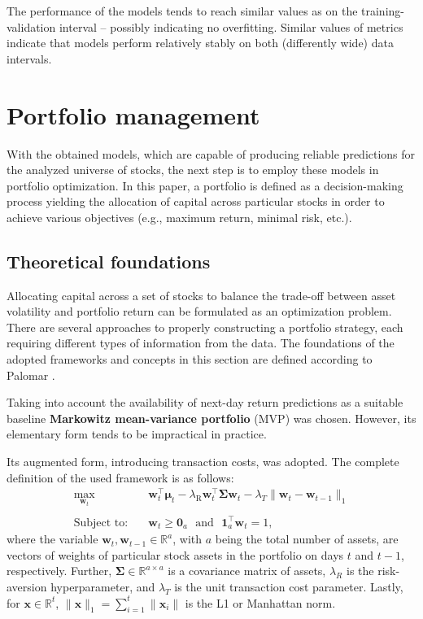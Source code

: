 \documentclass{svk_en}
\begin{document}
The performance of the models tends to reach similar values as on the training-validation interval -- possibly indicating no overfitting.
Similar values of metrics indicate that models perform relatively stably on both (differently wide) data intervals.

\section{Portfolio management}
With the obtained models, which are capable of producing reliable predictions for the analyzed universe of stocks, the next step
is to employ these models in portfolio optimization. In this paper, a portfolio is defined as a decision-making process yielding 
the allocation of capital across particular stocks in order to achieve various objectives (e.g., maximum return, minimal risk, etc.).

\subsection{Theoretical foundations}
Allocating capital across a set of stocks to balance the trade-off between asset
volatility and portfolio return can be formulated as an optimization problem. There
are several approaches to properly constructing a portfolio strategy, each requiring
different types of information from the data. The foundations of the adopted frameworks and concepts in this section are 
defined according to Palomar \cite{portfolio}.

Taking into account the availability of next-day return predictions as a suitable baseline
\textbf{Markowitz mean-variance portfolio} (MVP) was chosen. However, its elementary form 
tends to be impractical in practice.

Its augmented form, introducing transaction costs, was adopted. The complete definition of
the used framework is as follows:
\begin{equation*}
\begin{aligned}
\max_{\mathbf{w}_t} \quad 
& \mathbf{w}_t^{\top}\bm{\mu}_t 
- \lambda_{\text{R}} \mathbf{w}_t^{\top}\bm{\Sigma}\mathbf{w}_t 
- \lambda_{T} \|\mathbf{w}_t - \mathbf{w}_{t-1}\|_1 \\
\\
\text{Subject to:} \quad 
& \mathbf{w}_t \geq \mathbf{0}_a \>\>\> \text{and} \>\>\> \mathbf{1}_a^{\top}\mathbf{w}_t=1,
\end{aligned}
\end{equation*}
where the variable $\mathbf{w}_t, \mathbf{w}_{t-1} \in \mathbb{R}^a$, with $a$ being the total number of assets, are vectors
of weights of particular stock assets in the portfolio on days $t$ and $t-1$, respectively. Further, $\bm{\Sigma} \in \mathbb{R}^{a \times a}$ is a covariance
matrix of assets, $\lambda_R$ is the risk-aversion hyperparameter, and $\lambda_T$ is the unit transaction cost parameter. 
Lastly, for $\mathbf{x} \in \mathbb{R}^t$, $\|\mathbf{x}\|_1 = \sum_{i=1}^{t} \|\mathbf{x}_i\|$ is the L1 or Manhattan norm.
\end{document}
